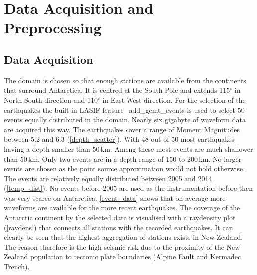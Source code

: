 
\chapter{Data Acquisition and Preprocessing}

\section{Data Acquisition}

The domain is chosen so that enough stations are available from the continents that surround Antarctica.
It is centred at the South Pole and extends 115$^\circ$ in North-South direction and 110$^\circ$ in
East-West direction. 
For the selection of the earthquakes the built-in LASIF feature \
add\_gcmt\_events is used to select 50 events equally distributed in the
domain. %
Nearly six gigabyte of waveform data are acquired this way.
The earthquakes cover a range of Moment Magnitudes between 5.2 and 6.3 (\autoref{depth_scatter}). 
With 48 out of 50 most earthquakes having a depth smaller than 50\,km. Among these most 
events are much shallower than 50\,km. Only two events are in a depth range of 150 to 200\,km. 
No larger events are chosen as the point source approximation would not hold otherwise. 
The events are relatively equally distributed between 2005 and 2014 (\autoref{temp_dist}). 
No events before 2005 are used as the instrumentation before then was very scarce on Antarctica. 
\autoref{event_data} shows that on average more waveforms are available for the more recent earthquakes.
The coverage of the Antarctic continent by the selected data is visualised with a raydensity plot (\autoref{raydens}) 
that connects all stations with the recorded earthquakes. It can clearly be seen that the highest aggregation of stations 
exists in New Zealand. The reason therefore is the high seismic risk due to the proximity of the New Zealand population to tectonic plate boundaries (Alpine Fault and Kermadec Trench). \\



